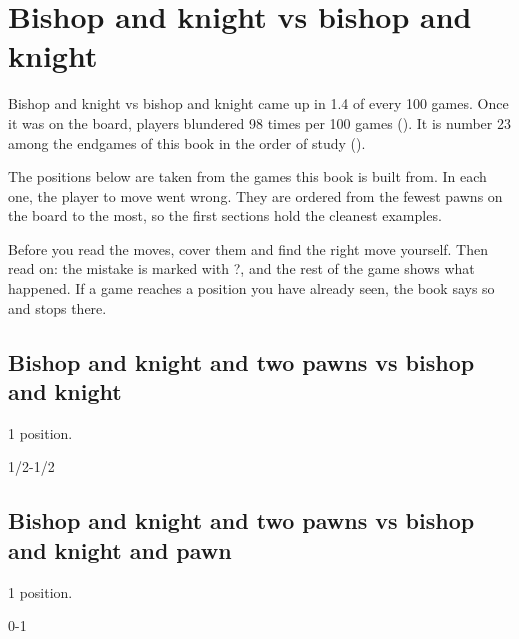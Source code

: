 \chapter{Bishop and knight vs bishop and knight}\label{ch:bishop-and-knight-vs-bishop-and-knight}
Bishop and knight vs bishop and knight came up in 1.4 of every 100 games. Once it was on the board, players blundered 98 times per 100 games (). It is number 23 among the endgames of this book in the order of study ().

The positions below are taken from the games this book is built from. In each one, the player to move went wrong. They are ordered from the fewest pawns on the board to the most, so the first sections hold the cleanest examples.

Before you read the moves, cover them and find the right move yourself. Then read on: the mistake is marked with ?, and the rest of the game shows what happened. If a game reaches a position you have already seen, the book says so and stops there.


\section{Bishop and knight and two pawns vs bishop and knight}
1 position.


1/2-1/2\par
\section{Bishop and knight and two pawns vs bishop and knight and pawn}
1 position.


0-1\par
